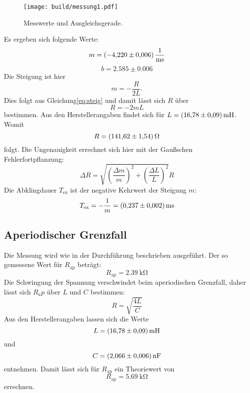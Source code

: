 \begin{figure}
    \centering
    \texttt{[image: build/messung1.pdf]}
    \caption{Messwerte und Ausgleichsgerade.}
    \label{fig:plot1}
\end{figure}
Es ergeben sich folgende Werte:
\begin{equation*}
  m=\SI{-4.22\pm0.006}{\per\milli\second}
\end{equation*}
\begin{equation*}
  b=2.585\pm0.006
\end{equation*}
Die Steigung ist hier
\begin{equation*}
  m=-\frac{R}{2L}.
\end{equation*}
Dies folgt aus Gleichung\eqref{eq:steig} und damit lässt sich $R$ über
\begin{equation*}
  R=-2mL
\end{equation*}
bestimmen.
Aus den Herstellerangaben findet sich für $L=\SI{16.78\pm0.09}{\milli\henry}$.
Womit
\begin{equation*}
  R=\SI{141.62\pm1.54}{\ohm}
\end{equation*}
folgt.
Die Ungenauigkeit errechnet sich hier mit der Gaußschen Fehlerfortpflanzung:
\begin{equation*}
  \Delta R= \sqrt{(\frac{\Delta m}{m})^2 + (\frac{\Delta L}{L})^2} R
\end{equation*}
Die Abklingdauer $T_\text{ex}$ ist der negative Kehrwert der Steigung $m$:
\begin{equation*}
  T_\text{ex}= -\frac{1}{m} = \SI{0.237\pm0.002}{\milli\second}
\end{equation*}


\subsection{Aperiodischer Grenzfall}
Die Messung wird wie in der Durchführung beschrieben ausgeführt.
Der so gemessene Wert für $R_\text{ap}$ beträgt:
\begin{equation*}
  R_\text{ap}=\SI{2.39}{\kilo\ohm}
\end{equation*}
Die Schwingung der Spannung verschwindet beim aperiodischen Grenzfall, daher lässt sich $R_ap$ über $L$ und $C$ bestimmen:
\begin{equation*}
  R=\sqrt{\frac{4L}{C}}
\end{equation*}
Aus den Herstellerangaben lassen sich die Werte
\begin{equation*}
  L=\SI{16.78\pm0.09}{\milli\henry}
\end{equation*}
und
\begin{equation*}
  C=\SI{2.066\pm0.006}{\nano\farad}
\end{equation*}
entnehmen.
Damit lässt sich für $R_\text{ap}$ ein Theoriewert von
\begin{equation*}
  R_\text{ap}=\SI{5.69}{\kilo\ohm}
\end{equation*}
errechnen.
